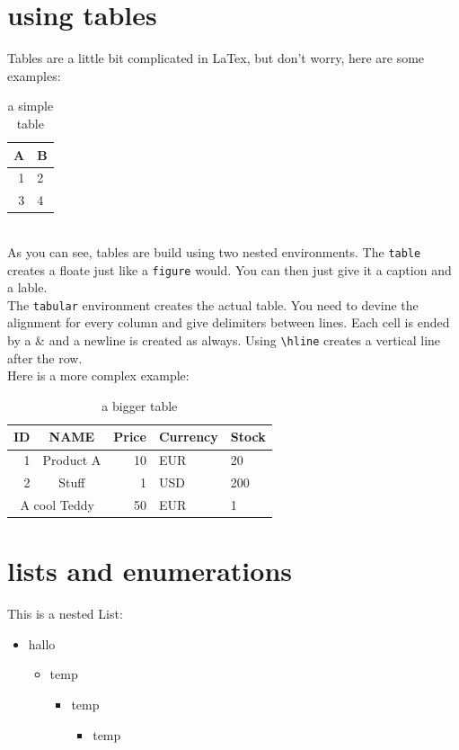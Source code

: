 \documentclass[	%
		fontsize=11pt,  %
		a4paper,	    %
		english,		%
		sans,			%
		f1,				%
	]{HsH-report}		%
\begin{document}
	\section{using tables}
		Tables are a little bit complicated in LaTex, but don't worry, here are some examples:
		\begin{table}
			\caption{a simple table}
			\label{tab: table 1}
			\begin{tabular}{r|l}
				A & B \\\hline\hline
				1 & 2 \\\hline
				3 & 4 \\\hline
			\end{tabular}
		\end{table}\\
		As you can see, tables are build using two nested environments. The \lstinline{table} creates a floate just like a \lstinline{figure} would.
		You can then just give it a caption and a lable.\\
		The \lstinline{tabular} environment creates the actual table. You need to devine the alignment for every column and give delimiters between
		lines. Each cell is ended by a \& and a newline is created as always. Using \lstinline{\hline} creates a vertical line after the row.\\
		Here is a more complex example:
		\begin{table}
			\caption{a bigger table}
			\begin{tabular}{r|c|r l|l}
				ID & NAME & Price & Currency & Stock \\\hline
				1 & Product A & 10 & EUR & 20 \\
				2 & Stuff & 1 & USD & 200 \\
				\multicolumn{2}{c|}{A cool Teddy} & 50 & EUR & 1\\\hline
			\end{tabular}
		\end{table}


	\section{lists and enumerations}
		This is a nested List:
		\begin{itemize}
			\item hallo
			\begin{itemize}
				\item temp
				\begin{itemize}
					\item temp
					\begin{itemize}
						\item temp
					\end{itemize}
				\end{itemize}
			\end{itemize}
		\end{itemize}
\end{document}
